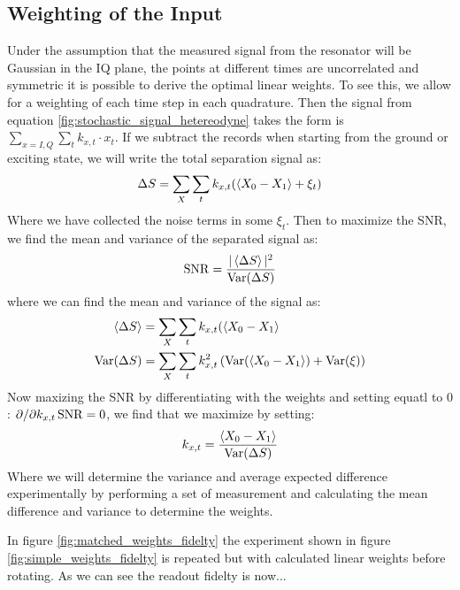 \subsection{Weighting of the Input}
Under the assumption that the measured signal from the resonator will be Gaussian in the IQ plane, the points at different times are uncorrelated and symmetric   it is possible to derive the optimal linear weights. To see this, we allow for a weighting of each time step in each quadrature. Then the signal from equation \ref{fig:stochastic_signal_hetereodyne} takes the form is $\sum_{x = I, Q}\sum_t k_{x, t} \cdot x_t$. If we subtract the records when starting from the ground or exciting state, we will write the total separation signal as:
\begin{equation}
    \Delta S = \sum_X \sum_t k_{x, t} (\expval{X_0 - X_1} + \xi_t)
\end{equation}
Where we have collected the noise terms in some $\xi_t$. Then to maximize the SNR, we find the mean and variance of the separated signal as:
\begin{equation}
    \operatorname{SNR} = \frac{|\expval{\Delta S}|^2}{\operatorname{Var}(\Delta S)} 
\end{equation}
where we can find the mean and variance of the signal as:
\begin{align}
    \expval{\Delta S} &= \sum_X \sum_t k_{x, t} (\expval{X_0 - X_1} \\
    \operatorname{Var}(\Delta S) &= \sum_X \sum_t k_{x, t}^2 \left( \operatorname{Var}(\expval{X_0 - X_1}) + \operatorname{Var}(\xi) \right)
\end{align}
Now maxizing the SNR by differentiating with the weights and setting equatl to $0$: $\partial / \partial k_{x, t} \operatorname{SNR} = 0$, we find that we maximize by setting:
\begin{equation}
    k_{x, t} = \frac{\expval{X_0 - X_1}}{\operatorname{Var}(\Delta S)}
\end{equation}
Where we will determine the variance and average expected difference experimentally by performing a set of measurement and calculating the mean difference and variance to determine the weights. 

In figure \ref{fig:matched_weights_fidelty} the experiment shown in figure \ref{fig:simple_weights_fidelty} is repeated but with calculated linear weights before rotating. As we can see the readout fidelty is now... 

